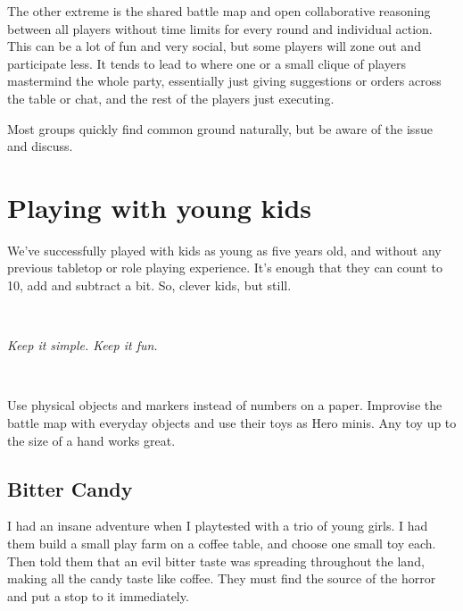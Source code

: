 The other extreme is the shared battle map and open collaborative reasoning between all players without time limits for every round and individual action. This can be a lot of fun and very social, but some players will zone out and participate less. It tends to lead to where one or a small clique of players mastermind the whole party, essentially just giving suggestions or orders across the table or chat, and the rest of the players just executing.

Most groups quickly find common ground naturally, but be aware of the issue and discuss.










\section*{Playing with young kids}
\label{sec:youngkids}  %
We've successfully played with kids as young as five years old, and without any previous tabletop or role playing experience. It's enough that they can count to 10, add and subtract a bit. So, clever kids, but still.

\

\noindent \emph{Keep it simple. Keep it fun.}

\

Use physical objects and markers instead of numbers on a paper. Improvise the battle map with everyday objects and use their toys as Hero minis. Any toy up to the size of a hand works great.


\subsection*{Bitter Candy}

I had an insane adventure when I playtested with a trio of young girls. I had them build a small play farm on a coffee table, and choose one small toy each. Then told them that an evil bitter taste was spreading throughout the land, making all the candy taste like coffee. They must find the source of the horror and put a stop to it immediately.

